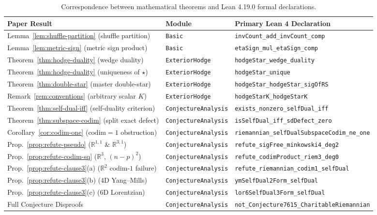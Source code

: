 \documentclass[11pt]{article}
\theoremstyle{definition}
\newcommand{\R}{\mathbb{R}}
\newcommand{\codim}{\mathrm{codim}}
\begin{document}
\begin{table}[ht]
\centering
\footnotesize
\setlength{\tabcolsep}{5pt}
\begin{tabular}{@{}lll@{}}
\toprule
\textbf{Paper Result} & \textbf{Module} & \textbf{Primary Lean 4 Declaration} \\
\midrule
Lemma~\ref{lem:shuffle-partition} (shuffle partition) & \texttt{Basic} & \texttt{invCount\_add\_invCount\_comp} \\
Lemma~\ref{lem:metric-sign} (metric sign product) & \texttt{Basic} & \texttt{etaSign\_mul\_etaSign\_comp} \\
Theorem~\ref{thm:hodge-duality} (wedge duality) & \texttt{ExteriorHodge} & \texttt{hodgeStar\_wedge\_duality} \\
Theorem~\ref{thm:hodge-duality} (uniqueness of $\star$) & \texttt{ExteriorHodge} & \texttt{hodgeStar\_unique} \\
Theorem~\ref{thm:double-star} (master double-star) & \texttt{ExteriorHodge} & \texttt{hodgeStar\_hodgeStar\_sigOfRS} \\
Remark~\ref{rem:conventions} (arbitrary scalar $K$) & \texttt{ExteriorHodge} & \texttt{hodgeStarK\_hodgeStarK} \\
Theorem~\ref{thm:self-dual-iff} (self-duality criterion) & \texttt{ConjectureAnalysis} & \texttt{exists\_nonzero\_selfDual\_iff} \\
Theorem~\ref{thm:subspace-codim} (split exact defect) & \texttt{ConjectureAnalysis} & \texttt{isSelfDual\_iff\_sdDefect\_zero} \\
Corollary~\ref{cor:codim-one} ($\codim = 1$ obstruction) & \texttt{ConjectureAnalysis} & \texttt{riemannian\_selfDualSubspaceCodim\_ne\_one} \\
Prop.~\ref{prop:refute-pseudo} ($\R^{1,1}$ \& $\R^{3,1}$) & \texttt{ConjectureAnalysis} & \texttt{refute\_sigFree\_minkowski4\_deg2} \\
Prop.~\ref{prop:refute-codim-sq} ($\R^3$, $(n-p)^2$) & \texttt{ConjectureAnalysis} & \texttt{refute\_codimProduct\_riem3\_deg0} \\
Prop.~\ref{prop:refute-clause3}(a) ($\R^2$ codim-$1$ failure) & \texttt{ConjectureAnalysis} & \texttt{refute\_riemannian\_codim1\_selfDual} \\
Prop.~\ref{prop:refute-clause3}(b) ($4$D Yang--Mills) & \texttt{ConjectureAnalysis} & \texttt{ymSelfDual2Form\_selfDual} \\
Prop.~\ref{prop:refute-clause3}(c) ($6$D Lorentzian) & \texttt{ConjectureAnalysis} & \texttt{lor6SelfDual3Form\_selfDual} \\
Full Conjecture Disproofs & \texttt{ConjectureAnalysis} & \texttt{not\_Conjecture7615\_CharitableRiemannian} \\
\bottomrule
\end{tabular}
\caption{Correspondence between mathematical theorems and Lean 4.19.0 formal declarations.}
\label{tab:lean-map}
\end{table}
\end{document}
